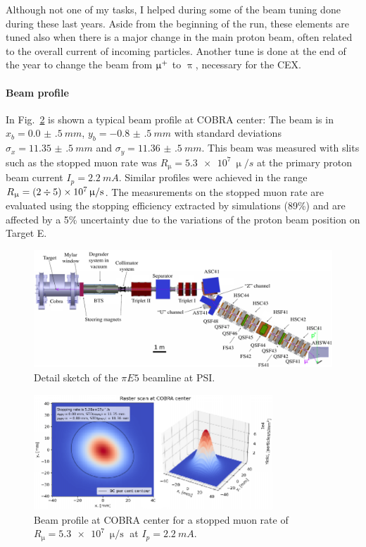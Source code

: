 \begin{refsection}
        \noindent
        Although not one of my tasks, I helped during some of the beam tuning done during these last years.
        Aside from the beginning of the run, these elements are tuned also when there is a major change in the main proton beam, often related to the overall current of incoming particles.
        Another tune is done at the end of the year to change the beam from $\upmu^+$ to $\uppi$, necessary for the CEX.
        
        \paragraph{Beam profile}
        In Fig.~\ref{fig:meg:beamprofile} is shown a typical beam profile at COBRA center: The beam is in $x_b = \SI{0.0(5)}{mm}$, $y_b = \SI{-0.8(5)}{mm}$ with standard deviations $\sigma_x = \SI{11.35(50)}{mm}$ and $\sigma_y = \SI{11.36(50)}{mm}$. 
        This beam was measured with slits such as the stopped muon rate was $R_\upmu = \SI{5.3e7}{\upmu \per s}$ at the primary proton beam current $I_p = \SI{2.2}{mA}$. 
        Similar profiles were achieved in the range $R_\upmu = (2 \divisionsymbol 5) \times \SI{e7}{\upmu \per s}$.
        The measurements on the stopped muon rate are evaluated using the stopping efficiency extracted by simulations (89\%) and are affected by a 5\% uncertainty due to the variations of the proton beam position on Target E.

        \begin{figure}
            \centering
            \includegraphics[width = \textwidth]{Figures/MEG/piE5_beamline.png}
            \caption{Detail sketch of the $\pi E5$ beamline at PSI.}
            \label{fig:pie5}
        \end{figure}
        
        \begin{figure}
            \centering
            \includegraphics[width = 0.8\textwidth]{Figures/MEG/meg_beamprofile.png}
            \caption{Beam profile at COBRA center for a stopped muon rate of $R_\upmu = \SI{5.3e7}{\upmu \per \second}$ at $I_p = \SI{2.2}{mA}$.}
            \label{fig:meg:beamprofile}
        \end{figure}


\end{refsection}
